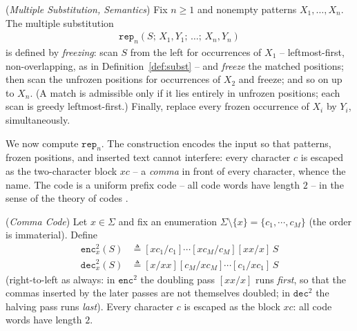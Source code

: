 \documentclass[runningheads,envcountsect]{llncs}
\begin{document}
\begin{definition}
    (\emph{Multiple Substitution, Semantics})
    \label{def:rep}
    Fix $n \geq 1$ and nonempty patterns $X_1, \dots, X_n$. The multiple substitution
    \begin{align*}
        \mathtt{rep}_n(S;\, X_1,Y_1;\,\dots;\,X_n,Y_n)
    \end{align*}
    is defined by \emph{freezing}: scan $S$ from the left for occurrences of $X_1$ -- leftmost-first, non-overlapping, as in Definition~\ref{def:subst} -- and \emph{freeze} the matched positions; then scan the unfrozen positions for occurrences of $X_2$ and freeze; and so on up to $X_n$. (A match is admissible only if it lies entirely in unfrozen positions; each scan is greedy leftmost-first.) Finally, replace every frozen occurrence of $X_i$ by $Y_i$, simultaneously.
\end{definition}

We now compute $\mathtt{rep}_n$. The construction encodes the input so that patterns, frozen positions, and inserted text cannot interfere: every character $c$ is escaped as the two-character block $xc$ -- a \emph{comma} in front of every character, whence the name. The code is a uniform prefix code -- all code words have length $2$ -- in the sense of the theory of codes \cite{berstel85}.

\begin{definition}
    (\emph{Comma Code})
    Let $x \in \Sigma$ and fix an enumeration $\Sigma \setminus \{x\} = \{c_1, \cdots, c_M\}$ (the order is immaterial). Define
    \begin{align}
        \mathtt{enc}^2_{x}(S) & \triangleq [xc_1/c_1]\cdots[xc_M/c_M][xx/x]\,S \\
        \mathtt{dec}^2_{x}(S) & \triangleq [x/xx][c_M/xc_M]\cdots[c_1/xc_1]\,S
    \end{align}
    (right-to-left as always: in $\mathtt{enc}^2$ the doubling pass $[xx/x]$ runs \emph{first}, so that the commas inserted by the later passes are not themselves doubled; in $\mathtt{dec}^2$ the halving pass runs \emph{last}). Every character $c$ is escaped as the block $xc$: all code words have length $2$.
\end{definition}
\end{document}
